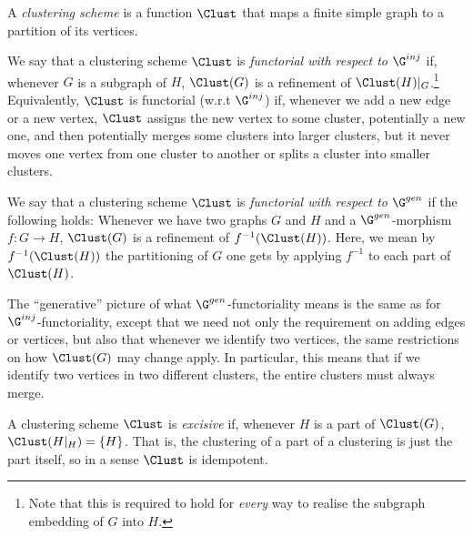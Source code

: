 \documentclass[a4paper,reqno,oneside]{article} %
\begin{document}
\begin{definition}
A \emph{clustering scheme} is a function $\Clust$ that maps a finite simple graph to a partition of its vertices.

We say that a clustering scheme $\Clust$ is \emph{functorial with respect to $\G^{inj}$} if, whenever $G$ is a subgraph of $H$, $\Clust(G)$ is a refinement of $\Clust(H)|_G$.\footnote{Note that this is required to hold for \emph{every} way to realise the subgraph embedding of $G$ into $H$.} Equivalently, $\Clust$ is functorial (w.r.t $\G^{inj}$) if, whenever we add a new edge or a new vertex, $\Clust$ assigns the new vertex to some cluster, potentially a new one, and then potentially merges some clusters into larger clusters, but it never moves one vertex from one cluster to another or splits a cluster into smaller clusters.

We say that a clustering scheme $\Clust$ is \emph{functorial with respect to $\G^{gen}$} if the following holds: Whenever we have two graphs $G$ and $H$ and a $\G^{gen}$-morphism $f: G \to H$, $\Clust(G)$ is a refinement of $f^{-1}(\Clust(H))$. Here, we mean by $f^{-1}(\Clust(H))$ the partitioning of $G$ one gets by applying $f^{-1}$ to each part of $\Clust(H)$.

The ``generative'' picture of what $\G^{gen}$-functoriality means is the same as for $\G^{inj}$-functoriality, except that we need not only the requirement on adding edges or vertices, but also that whenever we identify two vertices, the same restrictions on how $\Clust(G)$ may change apply. In particular, this means that if we identify two vertices in two different clusters, the entire clusters must always merge.
\end{definition}

\begin{definition}
A clustering scheme $\Clust$ is \emph{excisive} if, whenever $H$ is a part of $\Clust(G)$, $\Clust(H|_H) = \{H\}$. That is, the clustering of a part of a clustering is just the part itself, so in a sense $\Clust$ is idempotent. 
\end{definition}
\end{document}
